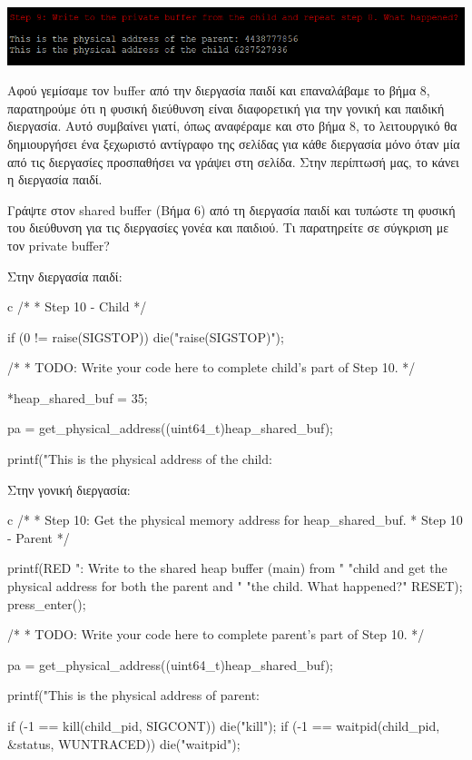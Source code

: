 \documentclass[12pt]{article}
\begin{document}
\centerline{\includegraphics[width=1\textwidth]{3_1_9.png}}

Αφού γεμίσαμε τον buffer από την διεργασία παιδί και επαναλάβαμε το βήμα 8, 
παρατηρούμε ότι η φυσική διεύθυνση είναι διαφορετική για την γονική 
και παιδική διεργασία. 
Αυτό συμβαίνει γιατί, όπως αναφέραμε και στο βήμα 8, το λειτουργικό θα δημιουργήσει 
ένα ξεχωριστό αντίγραφο της σελίδας για κάθε διεργασία μόνο όταν μία από τις 
διεργασίες προσπαθήσει να γράψει στη σελίδα. 
Στην περίπτωσή μας, το κάνει η διεργασία παιδί.

\begin{question}
Γράψτε στον shared buffer (Βήμα 6) από τη διεργασία παιδί και τυπώστε τη φυσική
του διεύθυνση για τις διεργασίες γονέα και παιδιού. Τι παρατηρείτε σε σύγκριση με
τον private buffer?
\end{question}

Στην διεργασία παιδί:

\begin{codeless}{c}
    /*
    * Step 10 - Child
    */
   
   if (0 != raise(SIGSTOP))
   {
       die("raise(SIGSTOP)");
   }
   
   /*
    * TODO: Write your code here to complete child's part of Step 10.
    */
   
   *heap_shared_buf = 35;
   
   pa = get_physical_address((uint64_t)heap_shared_buf);
   
   printf("This is the physical address of the child: %
\end{codeless}

Στην γονική διεργασία:

\begin{codeless}{c}
    /*
    * Step 10: Get the physical memory address for heap_shared_buf.
    * Step 10 - Parent
    */
   
   printf(RED ": Write to the shared heap buffer (main) from "
       "child and get the physical address for both the parent and "
       "the child. What happened?\n" RESET);
   press_enter();

   /*
    * TODO: Write your code here to complete parent's part of Step 10.
    */

   pa = get_physical_address((uint64_t)heap_shared_buf);

   printf("This is the physical address of parent: %
   
   if (-1 == kill(child_pid, SIGCONT))
   {
       die("kill");
   }
   if (-1 == waitpid(child_pid, &status, WUNTRACED))
   {
       die("waitpid");
   }
\end{codeless}
\end{document}
